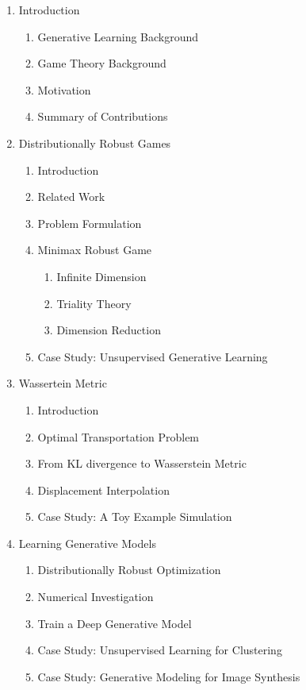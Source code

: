 \documentclass{article}
\begin{document}
\begin{enumerate}
	\item Introduction
    \begin{enumerate}
    	\item Generative Learning Background
        \item Game Theory Background
        \item Motivation
        \item Summary of Contributions
    \end{enumerate}

    \item Distributionally Robust Games
    \begin{enumerate}
    	\item Introduction
        \item Related Work
        \item Problem Formulation
        \item Minimax Robust Game
        \begin{enumerate}
            \item Infinite Dimension
            \item Triality Theory
            \item Dimension Reduction
        \end{enumerate}
        \item Case Study: Unsupervised Generative Learning
    \end{enumerate}

    \item Wassertein Metric
    \begin{enumerate}
    	\item Introduction
        \item Optimal Transportation Problem
        \item From KL divergence to Wasserstein Metric
        \item Displacement Interpolation
        \item Case Study: A Toy Example Simulation
    \end{enumerate}

    \item Learning Generative Models
    \begin{enumerate}
    	\item Distributionally Robust Optimization
        \item Numerical Investigation
        \item Train a Deep Generative Model
        \item Case Study: Unsupervised Learning for Clustering
        \item Case Study: Generative Modeling for Image Synthesis
    \end{enumerate}


\end{enumerate}
\end{document}
